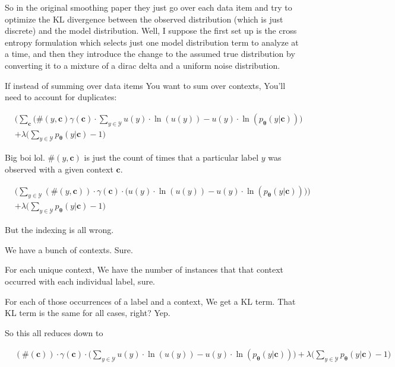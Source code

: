 \documentclass{article}
\newcommand{\vtheta}{\boldsymbol{\theta}}
\newcommand{\model}{p_{\vtheta}}
\newcommand{\context}{\boldsymbol{c}}
\begin{document}
			So in the original smoothing paper they just go over each data item and try to optimize the KL divergence between the observed distribution (which is just discrete) and the model distribution. Well, I suppose the first set up is the cross entropy formulation which selects just one model distribution term to analyze at a time, and then they introduce the change to the assumed true distribution by converting it to a mixture of a dirac delta and a uniform noise distribution.
		
			If instead of summing over data items You want to sum over contexts, You'll need to account for duplicates:
			
			\begin{align}
				&\bigg(\sum_{\context} (\#(y, \context)\gamma(\context)\cdot\sum_{y\in\mathcal{Y}} u(y)\cdot\ln(u(y)) - u(y)\cdot\ln(\model(y|\context))\bigg) \\
			&+ \lambda\bigg(\sum_{y\in\mathcal{Y}} \model(y|\context) -1 \bigg)
			\end{align}
			
			Big boi lol. $\#(y, \context)$ is just the count of times that a particular label $y$ was observed with a given context $\context$.
			
			\begin{align}
				&\bigg(\sum_{y\in\mathcal{Y}} (\#(y, \context))\cdot \gamma(\context)\cdot \big( u(y)\cdot\ln(u(y)) - u(y)\cdot\ln(\model(y|\context))\big)\bigg) \\
			&+ \lambda\bigg(\sum_{y\in\mathcal{Y}} \model(y|\context) -1 \bigg)
			\end{align}
			
			But the indexing is all wrong.
			
			We have a bunch of contexts. Sure.
			
			For each unique context, We have the number of instances that that context occurred with each individual label, sure.
			
			For each of those occurrences of a label and a context, We get a KL term. That KL term is the same for all cases, right? Yep.
			
			So this all reduces down to
			
			\begin{align}
				&(\#(\context))\cdot \gamma(\context)\cdot \bigg( \sum_{y\in\mathcal{Y}} u(y)\cdot\ln(u(y)) - u(y)\cdot\ln(\model(y|\context))\bigg) + \lambda\bigg(\sum_{y\in\mathcal{Y}} \model(y|\context) -1 \bigg)
			\end{align}
			
\end{document}
